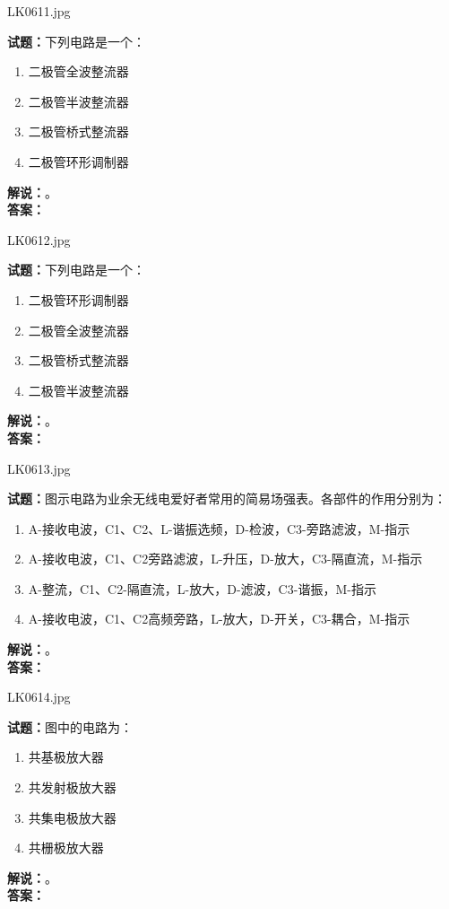 \documentclass{ctexbook}
\begin{document}
\bigskip

LK0611.jpg

\noindent\textbf{试题：}下列电路是一个：
\begin{enumerate}[leftmargin=3em]
  \item 二极管全波整流器
  \item 二极管半波整流器
  \item 二极管桥式整流器
  \item 二极管环形调制器
\end{enumerate}
\noindent\textbf{解说：}\textbf{}。\\\noindent\textbf{答案：}

\bigskip

LK0612.jpg

\noindent\textbf{试题：}下列电路是一个：
\begin{enumerate}[leftmargin=3em]
  \item 二极管环形调制器
  \item 二极管全波整流器
  \item 二极管桥式整流器
  \item 二极管半波整流器
\end{enumerate}
\noindent\textbf{解说：}\textbf{}。\\\noindent\textbf{答案：}

\bigskip

LK0613.jpg

\noindent\textbf{试题：}图示电路为业余无线电爱好者常用的简易场强表。各部件的作用分别为：
\begin{enumerate}[leftmargin=3em]
  \item A-接收电波，C1、C2、L-谐振选频，D-检波，C3-旁路滤波，M-指示
  \item A-接收电波，C1、C2旁路滤波，L-升压，D-放大，C3-隔直流，M-指示
  \item A-整流，C1、C2-隔直流，L-放大，D-滤波，C3-谐振，M-指示
  \item A-接收电波，C1、C2高频旁路，L-放大，D-开关，C3-耦合，M-指示
\end{enumerate}
\noindent\textbf{解说：}\textbf{}。\\\noindent\textbf{答案：}

\bigskip

LK0614.jpg

\noindent\textbf{试题：}图中的电路为：
\begin{enumerate}[leftmargin=3em]
  \item 共基极放大器
  \item 共发射极放大器
  \item 共集电极放大器
  \item 共栅极放大器
\end{enumerate}
\noindent\textbf{解说：}\textbf{}。\\\noindent\textbf{答案：}
\end{document}
